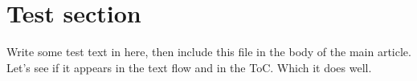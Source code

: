 \section{Test section}
\label{sec:test} 
Write some test text in here, then include this file in the body of the main article. Let's see if it appears in the text flow and in the ToC.
Which it does well.